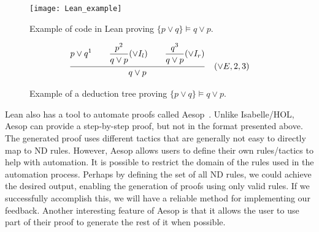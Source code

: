 \begin{figure}[htbp]
    \centering
    \texttt{[image: Lean\_example]}
    \caption{Example of code in Lean proving \(\{p \lor q\} \models q \lor p \).}
    \label{img:lean_example}
\end{figure}

\begin{figure}[h!]
    \centering
        \[
            \frac{ {\displaystyle {p \lor q}^1 
            \quad \quad \displaystyle \frac{\displaystyle p^2}{q \lor p \strut} (\lor I_l) \strut}
            \quad \quad \displaystyle \frac{\displaystyle q^3}{q \lor p \strut} (\lor I_r) \strut}
            {\displaystyle q \lor p \strut} \quad (\vee E, 2, 3)
          \]
          \caption{Example of a deduction tree proving \(\{p \lor q\} \models q \lor p \).}
          \label{tab:lean_example}
      \end{figure}

Lean also has a tool to automate proofs called Aesop~\cite{leanprovercommunity_2021_github}. Unlike Isabelle/HOL, Aesop can provide a step-by-step proof, but not in the format presented above. The generated proof uses different tactics that are generally not easy to directly map to \gls{ND} rules. However, Aesop allows users to define their own rules/tactics to help with automation. It is possible to restrict the domain of the rules used in the automation process. Perhaps by defining the set of all \gls{ND} rules, we could achieve the desired output, enabling the generation of proofs using only valid rules. If we successfully accomplish this, we will have a reliable method for implementing our feedback. Another interesting feature of Aesop is that it allows the user to use part of their proof to generate the rest of it when possible.




